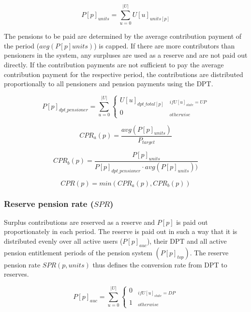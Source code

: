 \begin{equation}
P[p]_{units} = \sum_{u=0}^{|U|} U[u]_{units[p]}
\end{equation}

The pensions to be paid are determined by the average contribution payment of the 
period ($avg(P[p]units)$) is capped. If there are more contributors than pensioners in the system, any surpluses are used as a reserve and are not paid out directly. If the contribution payments are not sufficient to pay the average contribution payment for the respective period, the contributions are distributed proportionally to all pensioners and pension payments using the DPT.

\begin{dmath}
P[p]_{dpt\_pensioner} = 
\sum_{u=0}^{|U|} \begin{cases} 
U[u]_{dpt\_total[p]} & _{if U[u]_{state} = UP}\\
0 & _{otherwise}
\end{cases}
\end{dmath}

\begin{equation*}
CPR_{a}(p) = \frac{avg(P[p]_{units})}{P_{target}}
\end{equation*}

\begin{equation*}
CPR_{b}(p) = \frac{P[p]_{units}} {P[p]_{dpt\_pensioner} \cdot avg(P[p]_{units}))}
\end{equation*}

\begin{equation}
CPR(p) = min(CPR_{a}(p), CPR_{b}(p))
\end{equation}


\subsubsection{Reserve pension rate ($SPR$)}

Surplus contributions are reserved as a reserve and $P[p]$ is paid out proportionately in each period. The reserve is paid out in such a way that it is distributed evenly over all active users ($P[p]_{auc}$), their DPT and all active pension entitlement periods of the pension system $(P[p]_{top})$. The reserve pension rate $SPR(p, units)$ thus defines the conversion rate from DPT to reserves.


\begin{equation}
P[p]_{auc} = \sum_{u=0}^{|U|} \begin{cases} 
0 & _{if U[u]_{state} = DP}\\
1 & _{otherwise}
\end{cases}
\end{equation}

